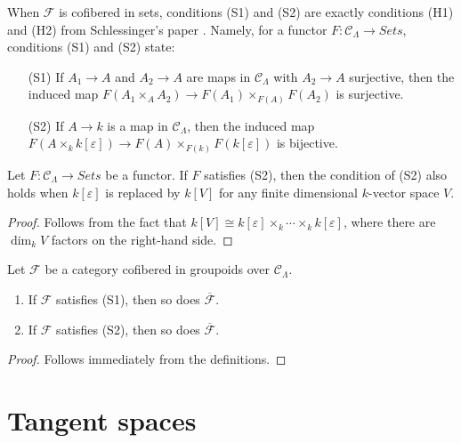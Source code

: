 \begin{remark}
\label{remark-compare-S1-S2-schlessinger}
When $\mathcal{F}$ is cofibered in sets, conditions (S1) and (S2) are exactly 
conditions (H1) and (H2) from Schlessinger's paper \cite{Sch}.
Namely, for a functor $F: \mathcal{C}_\Lambda \to 
\textit{Sets}$, conditions (S1) and (S2) state:
\begin{enumerate}
\item [(S1)] If $A_1 \to A$ and $A_2 \to A$ are maps in 
$\mathcal{C}_\Lambda$ with $A_2 \to A$ surjective, then the induced 
map $F(A_1 \times_{A} A_2) \to F(A_1) \times_{F(A)} F(A_2)$ is 
surjective.
\item [(S2)]  If $A \to k$ is a map in $\mathcal{C}_\Lambda$, then the 
induced map $F(A \times_{k} k[\varepsilon]) \to F(A) \times_{F(k)} 
F(k[\varepsilon])$ is bijective.
\end{enumerate}
\end{remark}

\begin{lemma}
\label{lemma-S2-extensions}
Let $F: \mathcal{C}_\Lambda \to \textit{Sets}$ be a functor.  If 
$F$ satisfies (S2), then the condition of (S2) also 
holds when $k[\varepsilon]$ is replaced by $k[V]$ for any finite dimensional 
$k$-vector space $V$.
\end{lemma}

\begin{proof}
Follows from the fact that $k[V] \cong k[\varepsilon] \times_{k} \cdots 
\times_{k} k[\varepsilon]$, where there are $\dim_k V$ factors on the 
right-hand side.
\end{proof}

\begin{lemma}
\label{lemma-S1-S2-associated-functor}
Let $\mathcal{F}$ be a category cofibered in groupoids over $\mathcal 
C_\Lambda$. 
\begin{enumerate}
\item If $\mathcal{F}$ satisfies (S1), then so does 
$\overline{\mathcal{F}}$. 
\item If $\mathcal{F}$ satisfies (S2), then so does 
$\overline{\mathcal{F}}$.
\end{enumerate}
\end{lemma}

\begin{proof}
Follows immediately from the definitions.
\end{proof}




\section{Tangent spaces}
\label{section-tangent-spaces}

